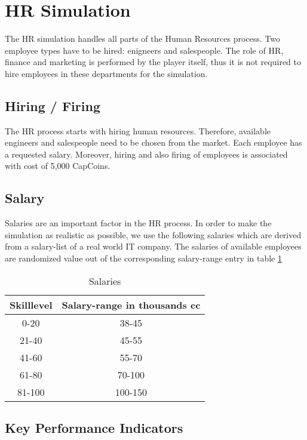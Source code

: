 \section{HR Simulation}
\label{sec:HRsim}
The HR simulation handles all parts of the Human Resources process. Two employee types have to be hired: enigneers and salespeople. The role of HR, finance and marketing is performed by the player itself, thus it is not required to hire employees in these departments for the simulation. 

\subsection{Hiring / Firing}
The HR process starts with hiring human resources. Therefore, available engineers and salespeople need to be chosen from the market. Each employee has a requested salary. Moreover, hiring and also firing of employees is associated with cost of 5,000 CapCoins. \cite{recruiterbox}

\subsection{Salary}
Salaries are an important factor in the HR process. In order to make the simulation as realistic as possible, we use the following salaries which are derived from a salary-list of a real world IT company. The salaries of available employees are randomized value out of the corresponding salary-range entry in table \ref{tab:Salaries}

\begin{table}
    \centering
\begin{tabular}{c|c}
    \hline
     \textbf{Skilllevel} & \textbf{Salary-range in thousands cc} \\
     \hline \hline
     0-20 & 38-45  \\
     21-40 & 45-55 \\
     41-60 & 55-70  \\
     61-80 & 70-100  \\
     81-100 & 100-150  \\
     \hline

\end{tabular}
\caption{Salaries}
    \label{tab:Salaries}
\end{table}

\subsection{Key Performance Indicators}
\label{sub:KPI}
